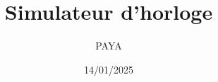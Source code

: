 \documentclass{beamer}
\title{Simulateur d'horloge}
\author{PAYA}
\institute{ENS}
\date{14/01/2025}
\begin{document}
\frame{\titlepage}

\frame{\tableofcontents}
\end{document}

